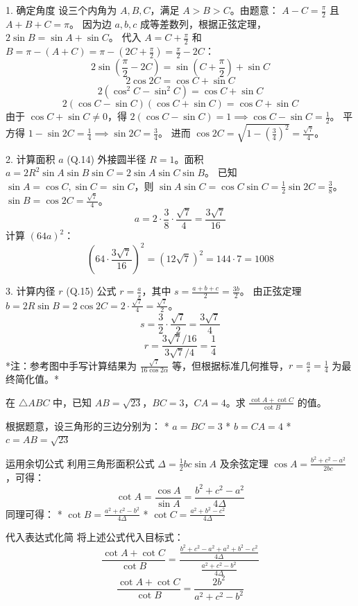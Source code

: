 \begin{questions}
\begin{solution}
 1. 确定角度
设三个内角为 $A, B, C$，满足 $A > B > C$。由题意：
$A - C = \frac{\pi}{2}$ 且 $A + B + C = \pi$。
因为边 $a, b, c$ 成等差数列，根据正弦定理，$2\sin B = \sin A + \sin C$。
代入 $A = C + \frac{\pi}{2}$ 和 $B = \pi - (A+C) = \pi - (2C + \frac{\pi}{2}) = \frac{\pi}{2} - 2C$：
\[ 2\sin(\frac{\pi}{2} - 2C) = \sin(C + \frac{\pi}{2}) + \sin C \]
\[ 2\cos 2C = \cos C + \sin C \]
\[ 2(\cos^2 C - \sin^2 C) = \cos C + \sin C \]
\[ 2(\cos C - \sin C)(\cos C + \sin C) = \cos C + \sin C \]
由于 $\cos C + \sin C \neq 0$，得 $2(\cos C - \sin C) = 1 \implies \cos C - \sin C = \frac{1}{2}$。
平方得 $1 - \sin 2C = \frac{1}{4} \implies \sin 2C = \frac{3}{4}$。
进而 $\cos 2C = \sqrt{1 - (\frac{3}{4})^2} = \frac{\sqrt{7}}{4}$。

 2. 计算面积 $a$ (Q.14)
外接圆半径 $R=1$。面积 $a = 2R^2 \sin A \sin B \sin C = 2 \sin A \sin C \sin B$。
已知 $\sin A = \cos C, \sin C = \sin C$，则 $\sin A \sin C = \cos C \sin C = \frac{1}{2} \sin 2C = \frac{3}{8}$。
$\sin B = \cos 2C = \frac{\sqrt{7}}{4}$。
\[ a = 2 \cdot \frac{3}{8} \cdot \frac{\sqrt{7}}{4} = \frac{3\sqrt{7}}{16} \]
计算 $(64a)^2$：
\[ (64 \cdot \frac{3\sqrt{7}}{16})^2 = (12\sqrt{7})^2 = 144 \cdot 7 = 1008 \]

3. 计算内径 $r$ (Q.15)
公式 $r = \frac{a}{s}$，其中 $s = \frac{a+b+c}{2} = \frac{3b}{2}$。
由正弦定理 $b = 2R\sin B = 2\cos 2C = 2 \cdot \frac{\sqrt{7}}{4} = \frac{\sqrt{7}}{2}$。
\[ s = \frac{3}{2} \cdot \frac{\sqrt{7}}{2} = \frac{3\sqrt{7}}{4} \]
\[ r = \frac{3\sqrt{7}/16}{3\sqrt{7}/4} = \frac{1}{4} \]
*注：参考图中手写计算结果为 $\frac{\sqrt{7}}{16 \cos 2\alpha}$ 等，但根据标准几何推导，$r = \frac{a}{s} = \frac{1}{4}$ 为最终简化值。*
\end{solution}

\question
在 $\triangle ABC$ 中，已知 $AB = \sqrt{23}$，$BC = 3$，$CA = 4$。求 $\frac{\cot A + \cot C}{\cot B}$ 的值。

\begin{solution}
根据题意，设三角形的三边分别为：
* $a = BC = 3$
* $b = CA = 4$
* $c = AB = \sqrt{23}$

运用余切公式
利用三角形面积公式 $\Delta = \frac{1}{2}bc \sin A$ 及余弦定理 $\cos A = \frac{b^2 + c^2 - a^2}{2bc}$，可得：
\[ \cot A = \frac{\cos A}{\sin A} = \frac{b^2 + c^2 - a^2}{4\Delta} \]
同理可得：
* $\cot B = \frac{a^2 + c^2 - b^2}{4\Delta}$
* $\cot C = \frac{a^2 + b^2 - c^2}{4\Delta}$

代入表达式化简
将上述公式代入目标式：
\[ \frac{\cot A + \cot C}{\cot B} = \frac{\frac{b^2 + c^2 - a^2 + a^2 + b^2 - c^2}{4\Delta}}{\frac{a^2 + c^2 - b^2}{4\Delta}} \]
\[ \frac{\cot A + \cot C}{\cot B} = \frac{2b^2}{a^2 + c^2 - b^2} \]


\end{solution}
\end{questions}
